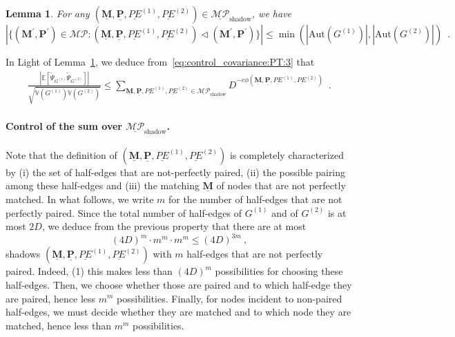 \documentclass{article}
\newtheorem{lemma}{Lemma}
\begin{document}
\begin{lemma}\label{lem:counting_isomorphism}
    For any $(\underline{\mathbf{M}}, \underline{\mathbf{P}}, \underline{PE}^{(1)},\underline{PE}^{(2)})\in \underline{\mathcal{M}\mathcal{P}}_{\mathrm{shadow}}$, we have 
    \[
    \left|\Big\{(\mathbf{M}^{'},\mathbf{P}^{'})\in \mathcal{M}\mathcal{P} :  (\underline{\mathbf{M}}, \underline{\mathbf{P}}, \underline{PE}^{(1)},\underline{PE}^{(2)})\triangleleft  (\mathbf{M}^{'},\mathbf{P}^{'}) \Big\}\right|\leq \min (|\mathrm{Aut}(G^{(1)})|,|\mathrm{Aut}(G^{(2)})|)\enspace .
    \]
\end{lemma}
In Light of Lemma~\ref{lem:counting_isomorphism}, we deduce from~\eqref{eq:control_covariance:PT:3} that 
\begin{eqnarray}\label{eq:control_covariance:PT:4}
    \frac{ \left| \mathbb{E}[\widetilde{\Psi}_{G^{(1)}} \widetilde{\Psi}_{G^{(2)}}]\right|}{\sqrt{\mathbb{V}(G^{(1)})\mathbb{V}(G^{(2)})}}  \leq   \sum_{\underline{\mathbf{M}},\underline{\mathbf{P}},\underline{PE}^{(1)},\underline{PE}^{(2)}\in \underline{\mathcal{MP}}_{\mathrm{shadow}}} D^{-c \phi(\underline{\mathbf{M}},\underline{\mathbf{P}},\underline{PE}^{(1)},\underline{PE}^{(2)})} \enspace . 
\end{eqnarray}





\paragraph{Control of the sum over $\underline{\mathcal{MP}}_{\mathrm{shadow}}$.}




Note that the definition of $(\underline{\mathbf{M}},\underline{\mathbf{P}},\underline{PE}^{(1)},\underline{PE}^{(2)})$ is completely characterized by (i) the set of half-edges that are not-perfectly paired, (ii) the possible pairing among these half-edges and (iii) the matching $\underline{\mathbf{M}}$ of nodes that are not perfectly matched.
In what follows, we write 
$m$
for the number of  half-edges that are not perfectly paired. Since the total number of half-edges of $G^{(1)}$ and of $G^{(2)}$ is at most $2D$, we deduce from the 
previous property that there are at most 
\begin{equation}\label{card:m}
   (4 D)^{m}\cdot m^{m}\cdot m^{m}\leq (4D)^{3m}\ ,
\end{equation}
    shadows $(\underline{\mathbf{M}},\underline{\mathbf{P}},\underline{PE}^{(1)},\underline{PE}^{(2)})$ with $m$ half-edges that are not perfectly paired. Indeed,  (1) this makes less than $(4D)^m$ possibilities for choosing these half-edges. Then, we choose whether those are paired and to which half-edge they are paired, hence less $m^m$ possibilities. Finally, for nodes incident to non-paired half-edges, we must decide whether they are matched and to which node they are matched, hence less than $m^m$ possibilities.
\end{document}
